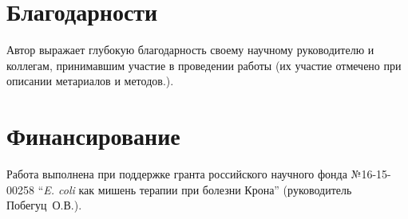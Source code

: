 \chapter{Благодарности}
Автор выражает глубокую благодарность своему научному руководителю и коллегам, принимавшим участие в проведении работы (их участие отмечено при описании метариалов и методов.). 


\chapter{Финансирование}
Работа выполнена при поддержке гранта российского научного фонда №16-15-00258 ``\textit{E. coli} как мишень терапии при болезни Крона'' (руководитель Побегуц~О.В.).
